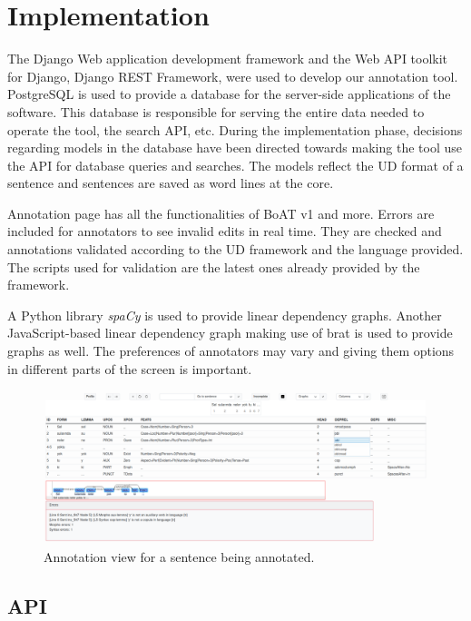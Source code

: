 \section{Implementation}
\label{sec:implementation}

The Django\cite{django} Web application development framework and the Web API toolkit for Django, Django REST Framework\cite{drf}, were used to develop our annotation tool.
PostgreSQL\cite{psql} is used to provide a database for the server-side applications of the software.
This database is responsible for serving the entire data needed to operate the tool, the search API, etc.
During the implementation phase, decisions regarding models in the database have been directed towards making the tool use the API for database queries and searches.
The models reflect the UD format of a sentence and sentences are saved as word lines at the core.

Annotation page has all the functionalities of BoAT v1 and more.
Errors are included for annotators to see invalid edits in real time.
They are checked and annotations validated according to the UD framework and the language provided.
The scripts used for validation are the latest ones already provided by the framework.\cite{UD-git}

A Python library \textit{spaCy}\cite{spacy} is used to provide linear dependency graphs.
Another JavaScript-based linear dependency graph\cite{spyssalo} making use of brat\cite{brat-vis} is used to provide graphs as well.
The preferences of annotators may vary and giving them options in different parts of the screen is important.

\begin{figure}[tbh]
    \centering
    \includegraphics[width=1\textwidth]{figures/1.png}
    \caption{Annotation view for a sentence being annotated.}
    \label{fig:demo-fig}
\end{figure}

\subsection{API}
\label{sec:api}

